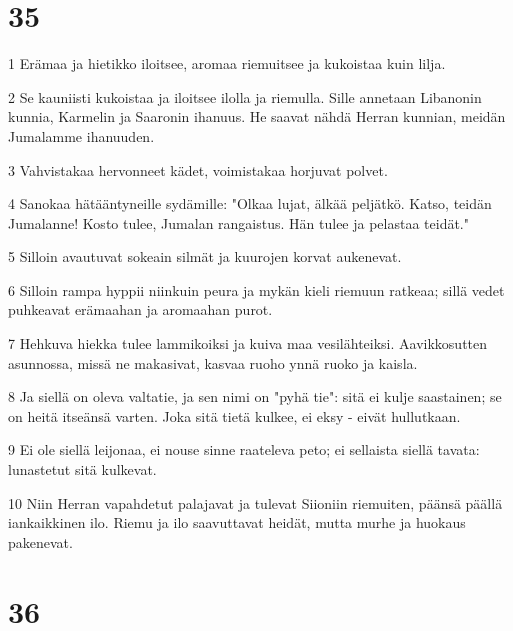 \chapter{35}

\par 1 Erämaa ja hietikko iloitsee, aromaa riemuitsee ja kukoistaa kuin lilja.
\par 2 Se kauniisti kukoistaa ja iloitsee ilolla ja riemulla. Sille annetaan Libanonin kunnia, Karmelin ja Saaronin ihanuus. He saavat nähdä Herran kunnian, meidän Jumalamme ihanuuden.
\par 3 Vahvistakaa hervonneet kädet, voimistakaa horjuvat polvet.
\par 4 Sanokaa hätääntyneille sydämille: "Olkaa lujat, älkää peljätkö. Katso, teidän Jumalanne! Kosto tulee, Jumalan rangaistus. Hän tulee ja pelastaa teidät."
\par 5 Silloin avautuvat sokeain silmät ja kuurojen korvat aukenevat.
\par 6 Silloin rampa hyppii niinkuin peura ja mykän kieli riemuun ratkeaa; sillä vedet puhkeavat erämaahan ja aromaahan purot.
\par 7 Hehkuva hiekka tulee lammikoiksi ja kuiva maa vesilähteiksi. Aavikkosutten asunnossa, missä ne makasivat, kasvaa ruoho ynnä ruoko ja kaisla.
\par 8 Ja siellä on oleva valtatie, ja sen nimi on "pyhä tie": sitä ei kulje saastainen; se on heitä itseänsä varten. Joka sitä tietä kulkee, ei eksy - eivät hullutkaan.
\par 9 Ei ole siellä leijonaa, ei nouse sinne raateleva peto; ei sellaista siellä tavata: lunastetut sitä kulkevat.
\par 10 Niin Herran vapahdetut palajavat ja tulevat Siioniin riemuiten, päänsä päällä iankaikkinen ilo. Riemu ja ilo saavuttavat heidät, mutta murhe ja huokaus pakenevat.

\chapter{36}

